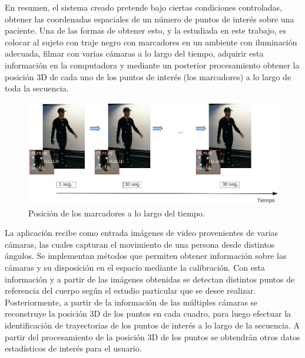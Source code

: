 En resumen, el sistema creado pretende bajo ciertas condiciones controladas, obtener las coordenadas espaciales de un número de puntos de interés sobre una paciente. Una de las formas de obtener esto, y la estudiada en este trabajo, es colocar al sujeto con traje negro con marcadores en un ambiente con iluminación adecuada, filmar con varias cámaras a lo largo del tiempo, adquirir esta información en la computadora y mediante un posterior procesamiento obtener la posición 3D de cada uno de los puntos de interés (los marcadores) a lo largo de toda la secuencia.

\begin{figure}[H]
\begin{center}
\includegraphics[scale=0.4]{img/Sistema_completo/diagrama_abuelas_2.jpg}
\end{center}
\caption{Posición de los marcadores a lo largo del tiempo.}
\label{abuela2}
\end{figure}

La aplicación recibe como entrada imágenes de video provenientes de varias cámaras, las cuales capturan el movimiento de una persona desde distintos ángulos. Se implementan métodos que permiten obtener información sobre las cámaras y su disposición en el espacio mediante la calibración. Con esta información y a partir de las imágenes obtenidas se detectan distintos puntos de referencia del cuerpo según el estudio particular que se desee realizar. Posteriormente, a partir de la información de las múltiples cámaras se reconstruye la posición 3D de los puntos en cada cuadro, para luego efectuar la identificación de trayectorias de los puntos de interés a lo largo de la secuencia. A partir del procesamiento de la posición 3D de los puntos se obtendrán otros datos estadísticos de interés para el usuario.\\

